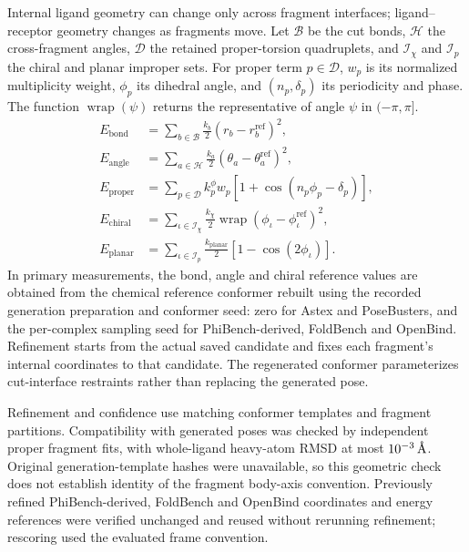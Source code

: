 \documentclass{article}
\newcommand{\angstrom}{\text{\normalfont\AA}}
\begin{document}
Internal ligand geometry can change only across fragment interfaces; ligand--receptor geometry changes as fragments move.
Let \(\mathcal B\) be the cut bonds, \(\mathcal H\) the cross-fragment angles, \(\mathcal D\) the retained proper-torsion quadruplets, and \(\mathcal I_\chi\) and \(\mathcal I_p\) the chiral and planar improper sets.
For proper term \(p\in\mathcal D\), \(w_p\) is its normalized multiplicity weight, \(\phi_p\) its dihedral angle, and \((n_p,\delta_p)\) its periodicity and phase.
The function \(\operatorname{wrap}(\psi)\) returns the representative of angle \(\psi\) in \(( -\pi,\pi]\).
\begin{align}
    E_{\mathrm{bond}}
    &=\sum_{b\in\mathcal{B}}\frac{k_b}{2}
      (r_b-r_b^{\mathrm{ref}})^2,\\
    E_{\mathrm{angle}}
    &=\sum_{a\in\mathcal{H}}\frac{k_a}{2}
      (\theta_a-\theta_a^{\mathrm{ref}})^2,\\
    E_{\mathrm{proper}}
    &=\sum_{p\in\mathcal D}k_p^\phi w_p
      [1+\cos(n_p\phi_p-\delta_p)],\\
    E_{\mathrm{chiral}}
    &=\sum_{\iota\in\mathcal{I}_\chi}\frac{k_\chi}{2}
      \operatorname{wrap}(\phi_\iota-\phi_\iota^{\mathrm{ref}})^2,\\
    E_{\mathrm{planar}}
    &=\sum_{\iota\in\mathcal{I}_p}\frac{k_{\mathrm{planar}}}{2}
      [1-\cos(2\phi_\iota)].
    \label{eq:si_bonded_energy}
\end{align}
In primary measurements, the bond, angle and chiral reference values are obtained from the chemical reference conformer rebuilt using the recorded generation preparation and conformer seed: zero for Astex and PoseBusters, and the per-complex sampling seed for PhiBench-derived, FoldBench and OpenBind. Refinement starts from the actual saved candidate and fixes each fragment's internal coordinates to that candidate. The regenerated conformer parameterizes cut-interface restraints rather than replacing the generated pose.

Refinement and confidence use matching conformer templates and fragment partitions. Compatibility with generated poses was checked by independent proper fragment fits, with whole-ligand heavy-atom RMSD at most $10^{-3}\,\angstrom$. Original generation-template hashes were unavailable, so this geometric check does not establish identity of the fragment body-axis convention. Previously refined PhiBench-derived, FoldBench and OpenBind coordinates and energy references were verified unchanged and reused without rerunning refinement; rescoring used the evaluated frame convention.
\end{document}

